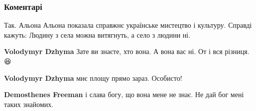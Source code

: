  
 
 
 
 
\subsubsection{Коментарі}
\label{sec:11_08_2021.fb.muharskij_antin.1.jazyk_isskustvo_ukraina.cmt}

\begin{itemize}
 

Так. Альона Альона показала справжнє українське мистецтво і культуру. Справді
кажуть: Людину з села можна витягнуть, а село з людини ні.

\begin{itemize}
 
\textbf{Volodymyr Dzhyma} Зате ви знаєте, хто вона. А вона вас ні. От і вся різниця. 😆


 
\textbf{Volodymyr Dzhyma} миє площу прямо зараз. Особисто!

 
\textbf{Demosthenes Freeman} і слава богу, що вона мене не знає. Не дай бог мені таких знайомих.


\end{itemize}
\end{itemize}
